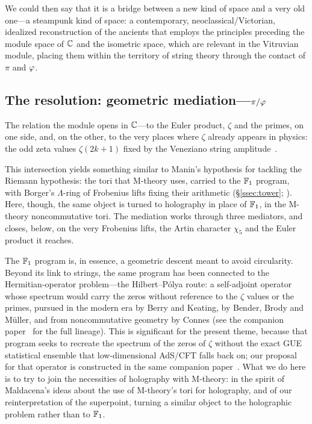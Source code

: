 We could then say that it is a bridge between a new kind of space and a very old one---a steampunk kind of space: a contemporary, neoclassical/Victorian, idealized reconstruction of the ancients that employs the principles preceding the module space of $\mathbb{C}$ and the isometric space, which are relevant in the Vitruvian module, placing them within the territory of string theory through the contact of $\pi$ and $\varphi$.

\subsection{The resolution: geometric mediation---\texorpdfstring{$\pi/\varphi$}{pi/phi}}\label{ssec:disc-resolution}

The relation the module opens in $\mathbb{C}$---to the Euler product, $\zeta$ and the primes, on one side, and, on the other, to the very places where $\zeta$ already appears in physics: the odd zeta values $\zeta(2k+1)$ fixed by the Veneziano string amplitude~\cite{Elvang2026,Veneziano}.

This intersection yields something similar to Manin's hypothesis for tackling the Riemann hypothesis: the tori that M-theory uses, carried to the $\mathbb{F}_1$ program, with Borger's $\Lambda$-ring of Frobenius lifts fixing their
arithmetic (\S\ref{ssec:tower}; \cite{manin04,F1}). Here, though, the same object is turned to holography in place of $\mathbb{F}_1$, in the M-theory noncommutative tori. The mediation works through three mediators, and closes, below, on the very Frobenius lifts, the Artin character $\chi_5$ and the Euler product it reaches.

The $\mathbb{F}_1$ program is, in essence, a geometric descent meant to avoid circularity. Beyond its link to strings, the same program has been connected to the Hermitian-operator problem---the Hilbert--P\'olya route: a self-adjoint operator whose spectrum would carry the zeros without reference to the $\zeta$ values or the primes, pursued in the modern era by Berry and Keating, by Bender, Brody and M\"uller, and from noncommutative geometry by Connes (see the companion paper~\cite{HP} for the full lineage). This is significant for the present theme, because that program seeks to recreate the spectrum of the zeros of $\zeta$ without the exact GUE statistical ensemble that low-dimensional AdS/CFT falls back on; our proposal for that operator is constructed in the same companion paper~\cite{HP}. What we do here is to try to join the necessities of holography with M-theory: in the spirit of Maldacena's ideas about the use of M-theory's tori for holography, and of our reinterpretation of the superpoint, turning a similar object to the holographic problem rather than to $\mathbb{F}_1$.

